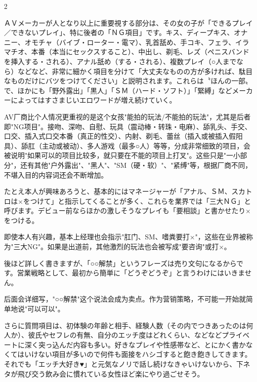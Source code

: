 \documentclass[12pt,UTF8]{ctexbook}
\begin{document}
\begin{paracol}{2}

ＡＶメーカーが人となり以上に重要視する部分は、その女の子が「できるプレイ／できないプレイ」、特に後者の「ＮＧ項目」です。キス、ディープキス、オナニー、オモチャ（バイブ・ローター・電マ）、乳首舐め、手コキ、フェラ、イラマチオ、本番（本当にセックスすること）、中出し、剃毛、レズ（ペニスバンドを挿入する・される）、アナル舐め（する・される）、複数プレイ（○人までなら）などなど、非常に細かく項目を分けて「大丈夫なものの方が多ければ、駄目なものだけにバツをつけてください」と説明されます。これらは〝ほんの一部〟で、ほかにも「野外露出」「黒人」「ＳＭ（ハード・ソフト）」「緊縛」などメーカーによってはすさまじいエロワードが増え続けていく。

\switchcolumn

AV厂商比个人情况更重视的是这个女孩"能拍的玩法/不能拍的玩法"，尤其是后者即"NG项目"。接吻、深吻、自慰、玩具（震动棒・转珠・电麻）、舔乳头、手交、口交、插入式口交本番（真正的性交）、内射、剃毛、蕾丝（插入或被插入假阳具）、舔肛（主动或被动）、多人游戏（最多○人）等等，分成非常细致的项目，会被说明"如果可以的项目比较多，就只要在不能的项目上打叉"。这些只是"一小部分"，还有其他"户外露出"、"黑人"、"SM（硬・软）"、"紧缚"等，根据厂商不同，不堪入目的内容词还会不断增加。

\switchcolumn*

たとえ本人が興味あろうと、基本的にはマネージャーが「アナル、ＳＭ、スカトロは×をつけて」と指示してくることが多く、これらを業界では「三大ＮＧ」と呼びます。デビュー前ならほかの激しそうなプレイも「要相談」と書かせたり×をつける。

\switchcolumn

即使本人有兴趣，基本上经理也会指示"肛门、SM、嗜粪要打×"，这些在业界被称为"三大NG"。如果是出道前，其他激烈的玩法也会被写成"要咨询"或打×。

\switchcolumn*

後ほど詳しく書きますが、「○○解禁」というフレーズは売り文句になるからです。営業戦略として、最初から簡単に「どうぞどうぞ」と言うわけにはいきません。

\switchcolumn

后面会详细写，"○○解禁"这个说法会成为卖点。作为营销策略，不可能一开始就简单地说"可以可以"。

\switchcolumn*

さらに質問項目は、初体験の年齢と相手、経験人数（その内でつきあったのは何人か）、彼氏やセフレの有無、自分のエッチ度はどれくらい、などなどプライベートに深く突っ込んだ内容も多い。好きなプレイや性感帯など、とにかく書かなくてはいけない項目が多いので何件も面接をハシゴすると飽き飽きしてきます。それでも「エッチ大好き♥」と元気なノリで話し続けなきゃいけないから、下ネタが飛び交う飲み会に慣れている女性ほど楽にやり過ごせそう。


\end{paracol}
\end{document}
